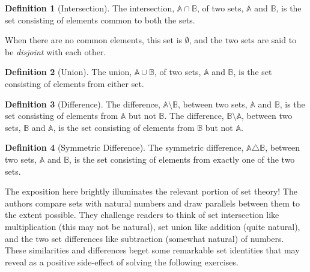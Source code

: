 \documentclass[11pt]{book}
\theoremstyle{definition}
\newtheorem{definition}{Definition}
\theoremstyle{plain}
\theoremstyle{definition}
\theoremstyle{problemstyle}
\theoremstyle{remark}
\theoremstyle{definition}
\begin{document}
\begin{definition}[Intersection]
    The intersection, $\mathbb{A}\cap\mathbb{B}$, of two sets, $\mathbb{A}$ and $\mathbb{B}$, is the set consisting of elements common to both the sets.

    When there are no common elements, this set is $\emptyset$, and the two sets are said to be \emph{disjoint} with each other.
    \label{def:set-intersection}
\end{definition}
\begin{definition}[Union]
    The union, $\mathbb{A}\cup\mathbb{B}$, of two sets, $\mathbb{A}$ and $\mathbb{B}$, is the set consisting of elements from either set.

    \label{def:set-union}
\end{definition}
\begin{definition}[Difference]
    The difference, $\mathbb{A}\setminus\mathbb{B}$, between two sets, $\mathbb{A}$ and $\mathbb{B}$, is the set consisting of elements from $\mathbb{A}$ but not $\mathbb{B}$.
    The difference, $\mathbb{B}\setminus\mathbb{A}$, between two sets, $\mathbb{B}$ and $\mathbb{A}$, is the set consisting of elements from $\mathbb{B}$ but not $\mathbb{A}$.

    \label{def:set-difference}
\end{definition}
\begin{definition}[Symmetric Difference]
    The symmetric difference, $\mathbb{A}\triangle\mathbb{B}$, between two sets, $\mathbb{A}$ and $\mathbb{B}$, is the set consisting of elements from exactly one of the two sets.

    \label{def:set-sym-difference}
\end{definition}

The exposition here brightly illuminates the relevant portion of set theory! The authors compare sets with natural numbers and draw parallels between them to the extent possible. They challenge readers to think of set intersection like multiplication (this may not be natural), set union like addition (quite natural), and the two set differences like subtraction (somewhat natural) of numbers. These similarities and differences beget some remarkable set identities that may reveal as a positive side-effect of solving the following exercises.
\end{document}
